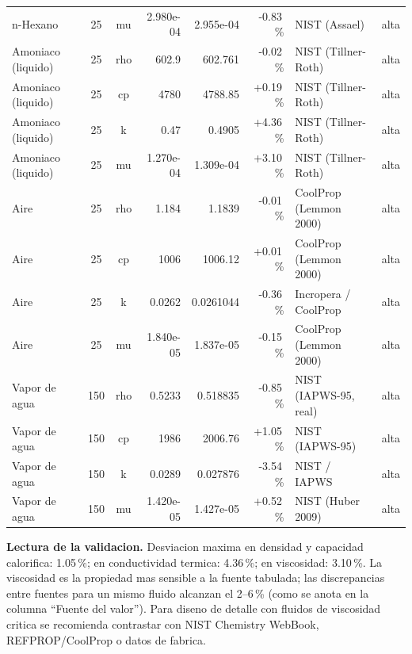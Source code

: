 \documentclass[11pt,a4paper]{article}
\begin{document}
{\begin{longtable}{@{}l c c r r r l c@{}}
n-Hexano & 25 & mu & 2.980e-04 & 2.955e-04 & -0.83\,\% & NIST (Assael) & alta \\
Amoniaco (liquido) & 25 & rho & 602.9 & 602.761 & -0.02\,\% & NIST (Tillner-Roth) & alta \\
Amoniaco (liquido) & 25 & cp & 4780 & 4788.85 & +0.19\,\% & NIST (Tillner-Roth) & alta \\
Amoniaco (liquido) & 25 & k & 0.47 & 0.4905 & +4.36\,\% & NIST (Tillner-Roth) & alta \\
Amoniaco (liquido) & 25 & mu & 1.270e-04 & 1.309e-04 & +3.10\,\% & NIST (Tillner-Roth) & alta \\
Aire & 25 & rho & 1.184 & 1.1839 & -0.01\,\% & CoolProp (Lemmon 2000) & alta \\
Aire & 25 & cp & 1006 & 1006.12 & +0.01\,\% & CoolProp (Lemmon 2000) & alta \\
Aire & 25 & k & 0.0262 & 0.0261044 & -0.36\,\% & Incropera / CoolProp & alta \\
Aire & 25 & mu & 1.840e-05 & 1.837e-05 & -0.15\,\% & CoolProp (Lemmon 2000) & alta \\
Vapor de agua & 150 & rho & 0.5233 & 0.518835 & -0.85\,\% & NIST (IAPWS-95, real) & alta \\
Vapor de agua & 150 & cp & 1986 & 2006.76 & +1.05\,\% & NIST (IAPWS-95) & alta \\
Vapor de agua & 150 & k & 0.0289 & 0.027876 & -3.54\,\% & NIST / IAPWS & alta \\
Vapor de agua & 150 & mu & 1.420e-05 & 1.427e-05 & +0.52\,\% & NIST (Huber 2009) & alta \\
\bottomrule
\end{longtable}}

\textbf{Lectura de la validacion.} Desviacion maxima en densidad y
capacidad calorifica: 1.05\,\%; en conductividad termica:
4.36\,\%; en viscosidad: 3.10\,\%. La
viscosidad es la propiedad mas sensible a la fuente tabulada; las
discrepancias entre fuentes para un mismo fluido alcanzan el 2--6\,\%
(como se anota en la columna ``Fuente del valor''). Para diseno de detalle
con fluidos de viscosidad critica se recomienda contrastar con NIST
Chemistry WebBook, REFPROP/CoolProp o datos de fabrica.
\end{document}
